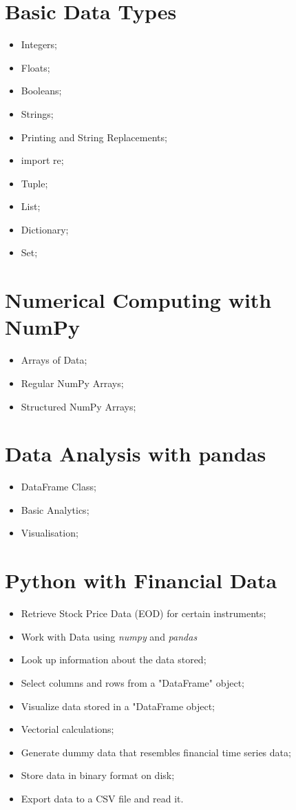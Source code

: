 \documentclass[11pt,a4paper]{report}
\begin{document}
\section{Basic Data Types}
\begin{itemize}
    \item Integers;
    \item Floats;
    \item Booleans;
    \item Strings;
    \item Printing and String Replacements;
    \item import re;
    \item Tuple;
    \item List;
    \item Dictionary;
    \item Set;
\end{itemize}
\section{Numerical Computing with NumPy}
\begin{itemize}
    \item Arrays of Data;
    \item Regular NumPy Arrays;
    \item Structured NumPy Arrays;
\end{itemize}
\section{Data Analysis with pandas}
\begin{itemize}
    \item DataFrame Class;
    \item Basic Analytics;
    \item Visualisation;
\end{itemize}
\section{Python with Financial Data}
\begin{itemize}
    \item Retrieve Stock Price Data (EOD) for certain instruments;
    \item Work with Data using \textit{numpy} and \textit{pandas}
    \item Look up information about the data stored;
    \item Select columns and rows from a "DataFrame" object;
    \item Visualize data stored in a "DataFrame object;
    \item Vectorial calculations;
    \item Generate dummy data that resembles financial time series data;
    \item Store data in binary format on disk;
    \item Export data to a CSV file and read it.
\end{itemize}
\end{document}
